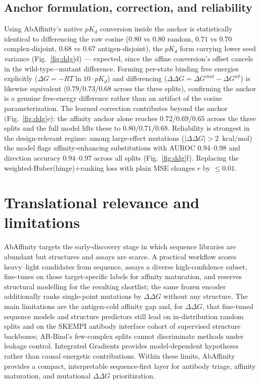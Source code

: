 \documentclass{article}
\newcommand{\ddg}{\ensuremath{\Delta\Delta G}}
\newcommand{\pkd}{\ensuremath{pK_d}}
\begin{document}
\subsection{Anchor formulation, correction, and reliability}
Using AbAffinity's native \pkd{} conversion inside the anchor is statistically identical to differencing the raw cosine ($0.80$ vs $0.80$ random, $0.71$ vs $0.70$ complex-disjoint, $0.68$ vs $0.67$ antigen-disjoint), the \pkd{} form carrying lower seed variance (Fig.~\ref{fig:ddg}d) --- expected, since the affine conversion's offset cancels in the wild-type$-$mutant difference. Forming per-state binding free energies explicitly ($\Delta G=-RT\ln10\cdot\pkd$) and differencing ($\ddg=\Delta G^{mut}-\Delta G^{wt}$) is likewise equivalent ($0.79$/$0.73$/$0.68$ across the three splits), confirming the anchor is a genuine free-energy difference rather than an artifact of the cosine parameterization. The learned correction contributes beyond the anchor (Fig.~\ref{fig:ddg}e): the affinity anchor alone reaches $0.72$/$0.69$/$0.65$ across the three splits and the full model lifts these to $0.80$/$0.71$/$0.68$. Reliability is strongest in the design-relevant regime: among large-effect mutations ($|\ddg|>2$~kcal/mol) the model flags affinity-enhancing substitutions with AUROC $0.94$--$0.98$ and direction accuracy $0.94$--$0.97$ across all splits (Fig.~\ref{fig:ddg}f). Replacing the weighted-Huber(hinge)$+$ranking loss with plain MSE changes $r$ by $\le0.01$.

\section{Translational relevance and limitations}
AbAffinity targets the early-discovery stage in which sequence libraries are abundant but structures and assays are scarce. A practical workflow scores heavy--light candidates from sequence, assays a diverse high-confidence subset, fine-tunes on those target-specific labels for affinity maturation, and reserves structural modelling for the resulting shortlist; the same frozen encoder additionally ranks single-point mutations by \ddg{} without any structure. The main limitations are the antigen-cold affinity gap and, for \ddg{}, that fine-tuned sequence models and structure predictors still lead on in-distribution random splits and on the SKEMPI antibody interface cohort of supervised structure backbones; AB-Bind's few-complex splits cannot discriminate methods under leakage control. Integrated Gradients provides model-dependent hypotheses rather than causal energetic contributions. Within these limits, AbAffinity provides a compact, interpretable sequence-first layer for antibody triage, affinity maturation, and mutational \ddg{} prioritization.

\clearpage



\clearpage
\appendix
\end{document}
